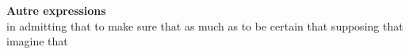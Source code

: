 {\sffamily\bfseries Autre expressions}\\
   {in admitting that}
   {to make sure that}
   {as much as}
   {to be certain that}
   {supposing that}
   {imagine that}
